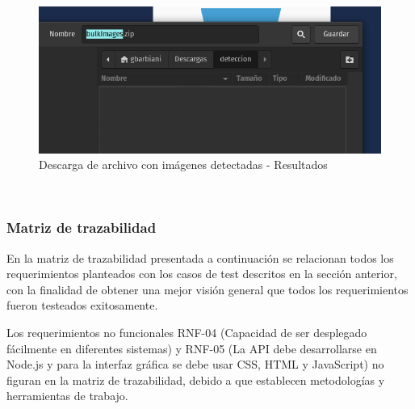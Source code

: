 \begin{figure}[h!]
\centering
    \includegraphics[width=1\textwidth]{img/FE - download file.png}
    \caption{Descarga de archivo con imágenes detectadas - Resultados}
    \label{fig:download-file}
\end{figure}

\hfill \break
\\

\newpage
\subsubsection{Matriz de trazabilidad}

En la matriz de trazabilidad presentada a continuación se relacionan todos los requerimientos planteados con los casos de test descritos en la sección anterior, con la finalidad de obtener una mejor visión general que todos los requerimientos fueron testeados exitosamente.

Los requerimientos no funcionales RNF-04 (Capacidad de ser desplegado fácilmente en diferentes sistemas) y RNF-05 (La API debe desarrollarse en Node.js y para la interfaz gráfica se debe usar CSS, HTML y JavaScript) no figuran en la matriz de trazabilidad, debido a que establecen metodologías y herramientas de trabajo.


